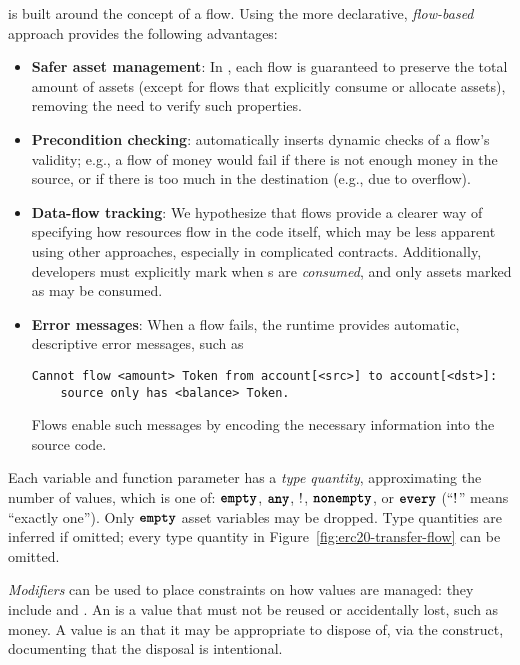 \documentclass[dvipsnames,runningheads]{llncs}
\begin{document}
\langName is built around the concept of a flow.
Using the more declarative, \emph{flow-based} approach provides the following advantages:
\begin{itemize}
    \item \textbf{Safer asset management}: In \langName, each flow is guaranteed to preserve the total amount of assets (except for flows that explicitly consume or allocate assets), removing the need to verify such properties.
    \item \textbf{Precondition checking}: \langName automatically inserts dynamic checks of a flow's validity; e.g., a flow of money would fail if there is not enough money in the source, or if there is too much in the destination (e.g., due to overflow).
    \item \textbf{Data-flow tracking}: We hypothesize that flows provide a clearer way of specifying how resources flow in the code itself, which may be less apparent using other approaches, especially in complicated contracts.
        Additionally, developers must explicitly mark when \assetTxt{}s are \emph{consumed}, and only assets marked as  may be consumed.
    \item \textbf{Error messages}: When a flow fails, the \langName runtime provides automatic, descriptive error messages, such as
\begin{lstlisting}[numbers=none, basicstyle=\small\ttfamily, xleftmargin=-5.0ex]
Cannot flow <amount> Token from account[<src>] to account[<dst>]:
    source only has <balance> Token.
\end{lstlisting}
        Flows enable such messages by encoding the necessary information into the source code.
\end{itemize}

Each variable and function parameter has a \emph{type quantity}, approximating the number of values, which is one of: $\textbf{\texttt{empty}}$, $\textbf{\texttt{any}}$, $!$, $\textbf{\texttt{nonempty}}$, or $\textbf{\texttt{every}}$ (``$!$'' means ``exactly one'').
Only $\textbf{\texttt{empty}}$ asset variables may be dropped.
Type quantities are inferred if omitted; every type quantity in Figure~\ref{fig:erc20-transfer-flow} can be omitted.

\emph{Modifiers} can be used to place constraints on how values are managed: they include  and .
An  is a value that must not be reused or accidentally lost, such as money.
A  value is an  that it may be appropriate to dispose of, via the  construct, documenting that the disposal is intentional.
\end{document}
